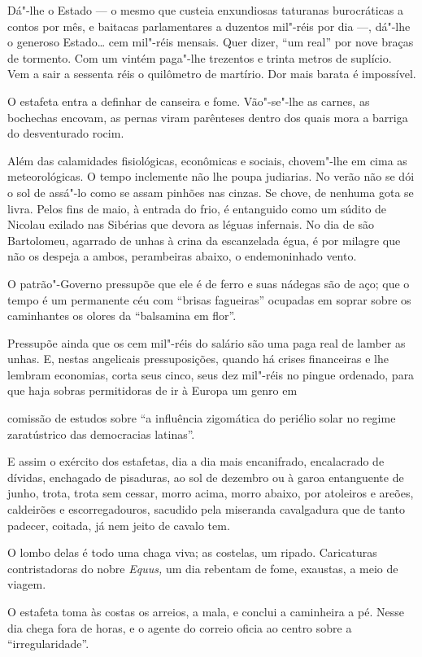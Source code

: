 Dá"-lhe o Estado --- o mesmo que custeia enxundiosas taturanas
burocráticas a contos por mês, e baitacas parlamentares a duzentos
mil"-réis por dia ---, dá"-lhe o generoso Estado\ldots{} cem mil"-réis mensais.
Quer dizer, ``um real'' por nove braças de tormento. Com um vintém
paga"-lhe trezentos e trinta metros de suplício. Vem a sair a sessenta
réis o quilômetro de martírio. Dor mais barata é impossível.

O estafeta entra a definhar de canseira e fome. Vão"-se"-lhe as carnes, as
bochechas encovam, as pernas viram parênteses dentro dos quais mora a
barriga do desventurado rocim.

Além das calamidades fisiológicas, econômicas e sociais, chovem"-lhe em
cima as meteorológicas. O tempo inclemente não lhe poupa judiarias. No
verão não se dói o sol de assá"-lo como se assam pinhões nas cinzas. Se
chove, de nenhuma gota se livra. Pelos fins de maio, à entrada do frio,
é entanguido como um súdito de Nicolau exilado nas Sibérias que devora
as léguas infernais. No dia de são Bartolomeu, agarrado de unhas à crina
da escanzelada égua, é por milagre que não os despeja a ambos,
perambeiras abaixo, o endemoninhado vento.

O patrão"-Governo pressupõe que ele é de ferro e suas nádegas são de aço;
que o tempo é um permanente céu com ``brisas fagueiras'' ocupadas em
soprar sobre os caminhantes os olores da ``balsamina em flor''.

Pressupõe ainda que os cem mil"-réis do salário são uma paga real de
lamber as unhas. E, nestas angelicais pressuposições, quando há crises
financeiras e lhe lembram economias, corta seus cinco, seus dez mil"-réis
no pingue ordenado, para que haja sobras permitidoras de ir à Europa um
genro em

comissão de estudos sobre ``a influência zigomática do periélio solar no
regime zaratústrico das democracias latinas''.

E assim o exército dos estafetas, dia a dia mais encanifrado,
encalacrado de dívidas, enchagado de pisaduras, ao sol de dezembro ou à
garoa entanguente de junho, trota, trota sem cessar, morro acima, morro
abaixo, por atoleiros e areões, caldeirões e escorregadouros, sacudido
pela miseranda cavalgadura que de tanto padecer, coitada, já nem jeito
de cavalo tem.

O lombo delas é todo uma chaga viva; as costelas, um ripado. Caricaturas
contristadoras do nobre \emph{Equus,} um dia rebentam de fome, exaustas,
a meio de viagem.

O estafeta toma às costas os arreios, a mala, e conclui a caminheira a
pé. Nesse dia chega fora de horas, e o agente do correio oficia ao
centro sobre a ``irregularidade''.

